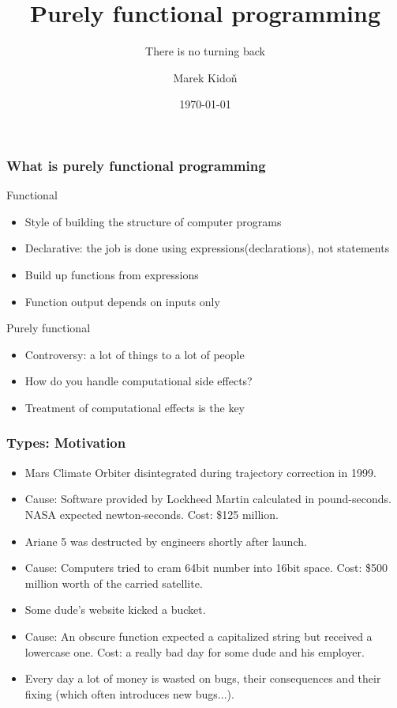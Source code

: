 \documentclass[11pt]{beamer}
\author{Marek Kido\v{n}}
\title{Purely functional programming}
\subtitle{There is no turning back}
\date{\today}
\begin{document}
	
	\begin{frame}[plain]
		\titlepage
	\end{frame}

	\begin{frame}
		\frametitle{What is purely functional programming}
			\begin{block}{Functional}
				\begin{itemize}[<+->]
					\item Style of  building the structure of computer programs
					\item Declarative: the job is done using expressions(declarations), not statements
					\item Build up functions from expressions
					\item Function output depends on inputs only
				\end{itemize}
			\end{block}
		
			\begin{block}{Purely functional}
				\begin{itemize}[<+->]
					\item Controversy: a lot of things to a lot of people
					\item How do you handle computational side effects?
					\item Treatment of computational effects is the key
				\end{itemize}
			\end{block}
	\end{frame}

	\begin{frame}
		\frametitle{Types: Motivation}
			\begin{itemize}[<+->]
				\item Mars Climate Orbiter disintegrated during trajectory correction in 1999.
				\item Cause: Software provided by Lockheed Martin calculated in pound-seconds. NASA expected newton-seconds. Cost: \$125 million.
				\item Ariane 5 was destructed by engineers shortly after launch.
				\item Cause: Computers tried to cram 64bit number into 16bit space. Cost: \$500 million worth of the carried satellite.
				\item Some dude's website kicked a bucket.
				\item Cause: An obscure function expected a capitalized string but received a lowercase one. Cost: a really bad day for some dude and his employer.
				\item Every day a lot of money is wasted on bugs, their consequences and their fixing (which often introduces new bugs...).
			\end{itemize}
	\end{frame}
\end{document}
